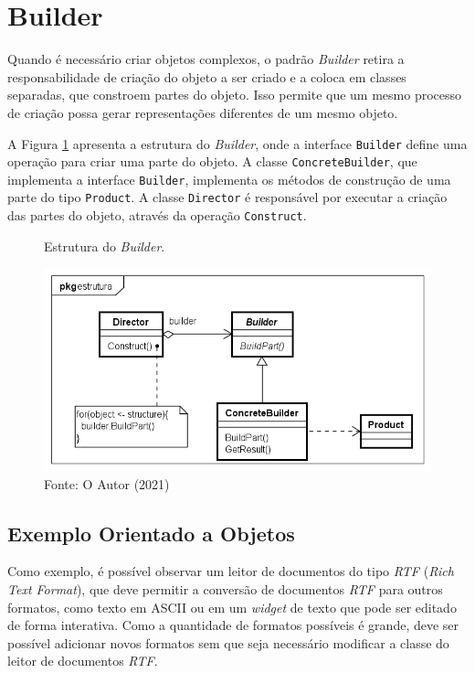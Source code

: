 \section{Builder}

Quando é necessário criar objetos  
complexos, o padrão \textit{Builder} retira a 
responsabilidade de criação do objeto a 
ser criado e a coloca em classes separadas, 
que constroem partes do objeto. 
Isso permite que um mesmo processo de criação 
possa gerar representações diferentes de um mesmo 
objeto.\cite{gamma:1995}

A Figura \ref{builder_struct} apresenta 
a estrutura do \textit{Builder}, onde a interface 
\texttt{Builder} define uma operação para criar uma 
parte do objeto. A classe \texttt{ConcreteBuilder}, que 
implementa a interface \texttt{Builder}, 
implementa os métodos de construção de 
uma parte do tipo \texttt{Product}. A classe \texttt{Director} 
é responsável por executar a criação das 
partes do objeto, através da operação 
\texttt{Construct}.

\begin{figure}[htb]
	\caption{\label{builder_struct}Estrutura do \textit{Builder}.}
	\begin{center}
	    \includegraphics[scale=0.5]{5_padroes-contexto-funcional/5.1_criacionais/5.1.3_builder/builder_estrutura.png}
	\end{center}
  \caption*{Fonte: O Autor (2021)}
\end{figure}

\subsection*{Exemplo Orientado a Objetos}

Como exemplo, é possível observar um leitor de 
documentos do tipo \textit{RTF} (\textit{Rich Text Format}), 
que deve permitir a conversão de documentos \textit{RTF} 
para outros formatos, como texto em ASCII ou em um 
\textit{widget} de texto que pode ser editado de 
forma interativa. Como a quantidade de formatos 
possíveis é grande, deve ser possível adicionar 
novos formatos sem que seja necessário modificar 
a classe do leitor de documentos \textit{RTF}. 

